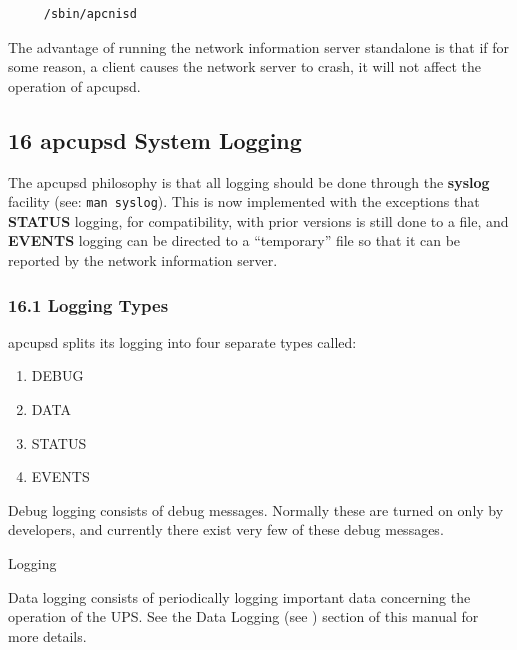 {{{{{{{{{{\begin{verbatim}
     /sbin/apcnisd
\end{verbatim}
\normalsize

The advantage of running the network information server standalone is that if
for some reason, a client causes the network server to crash, it will not
affect the operation of apcupsd. 

\label{apcupsd-System-Logging}

\subsection*{16 apcupsd System Logging}

\label{index-Logging_002c-System-166}
\label{index-System-Logging-167}
The apcupsd philosophy is that all logging should be done through the {\bf
syslog} facility (see: {\tt man syslog}). This is now implemented with the
exceptions that {\bf STATUS} logging, for compatibility, with prior versions
is still done to a file, and {\bf EVENTS} logging can be directed to a
``temporary'' file so that it can be reported by the network information
server. 

\label{Logging-Types}

\subsubsection*{16.1 Logging Types}

\label{index-Logging_002c-types-168}
apcupsd splits its logging into four separate types called:  

\begin{enumerate}
\item DEBUG  
\item DATA  
\item STATUS  
\item EVENTS  
\end{enumerate}

Debug logging consists of debug messages. Normally these are turned on only by
developers, and currently there exist very few of these debug messages. 

{\smallDATA Logging}

Data logging consists of periodically logging important data concerning the
operation of the UPS. See the Data Logging (see 
) section of this manual for more
details. 

}}}}}}}}}}
